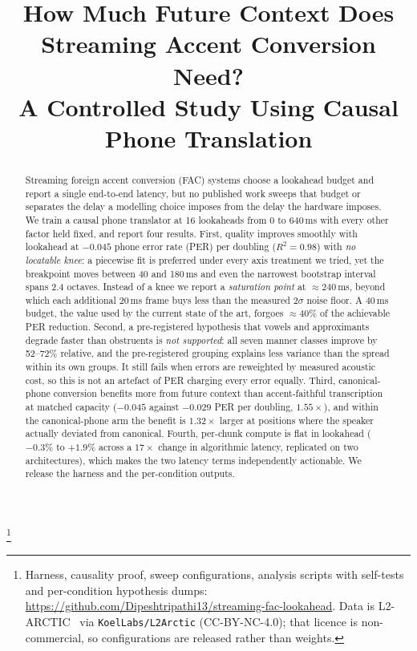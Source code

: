 \documentclass{article}
\title{How Much Future Context Does Streaming Accent Conversion Need?\\
A Controlled Study Using Causal Phone Translation}
\newcommand{\blfootnote}[1]{%
  \begingroup\renewcommand\thefootnote{}\footnote{#1}\addtocounter{footnote}{-1}\endgroup}
\begin{document}
\ninept
\maketitle


\begin{abstract}
\noindent
Streaming foreign accent conversion (FAC) systems choose a lookahead budget and
report a single end-to-end latency, but no published work sweeps that budget or
separates the delay a modelling choice imposes from the delay the hardware
imposes. We train a causal phone translator at 16 lookaheads from 0 to 640\,ms
with every other factor held fixed, and report four results. First, quality
improves smoothly with lookahead at $-0.045$ phone error rate (PER) per
doubling ($R^2=0.98$) with \emph{no locatable knee}: a piecewise fit is
preferred under every axis treatment we tried, yet the breakpoint moves between
40 and 180\,ms and even the narrowest bootstrap interval spans 2.4 octaves.
Instead of a knee we report a \emph{saturation point} at ${\approx}240$\,ms,
beyond which each additional 20\,ms frame buys less than the measured
$2\sigma$ noise floor. A 40\,ms budget, the value used by the current
state of the art, forgoes ${\approx}40\%$ of the achievable PER reduction.
Second, a pre-registered hypothesis that vowels and approximants degrade faster
than obstruents is \emph{not supported}: all seven manner classes improve by
52--72\% relative, and the pre-registered grouping explains less variance than
the spread within its own groups. It still fails when errors are reweighted by
measured acoustic cost, so this is not an artefact of PER charging every error
equally. Third, canonical-phone conversion benefits more from future context than
accent-faithful transcription at matched capacity ($-0.045$ against $-0.029$
PER per doubling, $1.55\times$), and within the canonical-phone arm the benefit is
$1.32\times$ larger at positions where the speaker actually deviated from
canonical. Fourth, per-chunk compute is flat in
lookahead ($-0.3\%$ to $+1.9\%$ across a $17\times$ change in algorithmic
latency, replicated on two architectures), which makes the two latency terms
independently actionable. We release the harness and the per-condition outputs.
\end{abstract}

\blfootnote{Harness, causality proof, sweep configurations, analysis scripts
with self-tests and per-condition hypothesis dumps:
\url{https://github.com/Dipeshtripathi13/streaming-fac-lookahead}. Data is
L2-ARCTIC~\cite{l2arctic2018} via \texttt{KoelLabs/L2Arctic} (CC-BY-NC-4.0);
that licence is non-commercial, so configurations are released rather than
weights.}
\end{document}
